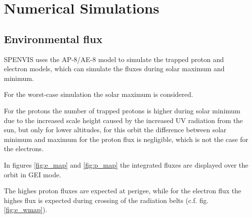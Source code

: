 \section{Numerical Simulations}

\subsection{Environmental flux}

SPENVIS uses the AP-8/AE-8 model to simulate the trapped proton and electron models, which can simulate the fluxes during solar maximum and minimum.

For the worst-case simulation the solar maximum is considered. 

For the protons the number of trapped protons is higher during solar minimum due to the increased scale height caused by the increased UV radiation from the sun, but only for lower altitudes, for this orbit the difference between solar minimum and maximum for the proton flux is negligible, which is not the case for the electrons.

In figures \ref{fig:e_map} and \ref{fig:p_map} the integrated fluxes are displayed over the orbit in GEI mode.

The highes proton fluxes are expected at perigee, while for the electron flux the highes flux is expected during crossing of the radiation belts (c.f. fig. \ref{fig:e_wmap}).

